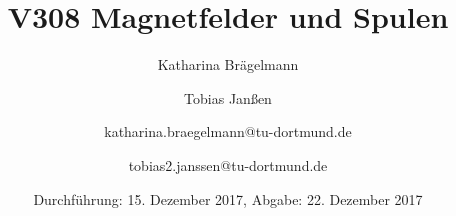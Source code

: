 
\title{V308 Magnetfelder und Spulen}
\author{Katharina Brägelmann \and Tobias Janßen \and katharina.braegelmann@tu-dortmund.de \and tobias2.janssen@tu-dortmund.de}
\date{Durchführung: 15. Dezember 2017, Abgabe: 22. Dezember 2017}
\maketitle

\tableofcontents
